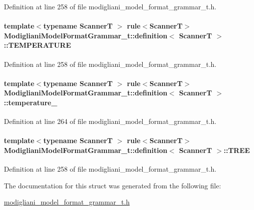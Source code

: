 Definition at line 258 of file modigliani\_\-model\_\-format\_\-grammar\_\-t.h.

\paragraph[{TEMPERATURE}]{\setlength{\rightskip}{0pt plus 5cm}template$<$typename ScannerT $>$ rule$<$ScannerT$>$ {\bf ModiglianiModelFormatGrammar\_\-t::definition}$<$ ScannerT $>$::{\bf TEMPERATURE}}\hfill\label{struct_modigliani_model_format_grammar__t_1_1definition_a3ee9104d7ef1a622aa2279a23b545945}


Definition at line 258 of file modigliani\_\-model\_\-format\_\-grammar\_\-t.h.

\paragraph[{temperature\_\-}]{\setlength{\rightskip}{0pt plus 5cm}template$<$typename ScannerT $>$ rule$<$ScannerT$>$ {\bf ModiglianiModelFormatGrammar\_\-t::definition}$<$ ScannerT $>$::{\bf temperature\_\-}}\hfill\label{struct_modigliani_model_format_grammar__t_1_1definition_ae280c6d1c6bbfd8fb277876a6c65c2d5}


Definition at line 264 of file modigliani\_\-model\_\-format\_\-grammar\_\-t.h.

\paragraph[{TREE}]{\setlength{\rightskip}{0pt plus 5cm}template$<$typename ScannerT $>$ rule$<$ScannerT$>$ {\bf ModiglianiModelFormatGrammar\_\-t::definition}$<$ ScannerT $>$::{\bf TREE}}\hfill\label{struct_modigliani_model_format_grammar__t_1_1definition_a940d7511a81287f27ab67c84f3b5ea58}


Definition at line 258 of file modigliani\_\-model\_\-format\_\-grammar\_\-t.h.



The documentation for this struct was generated from the following file:\begin{DoxyCompactItemize}
\item 
\hyperlink{modigliani__model__format__grammar__t_8h}{modigliani\_\-model\_\-format\_\-grammar\_\-t.h}\end{DoxyCompactItemize}
